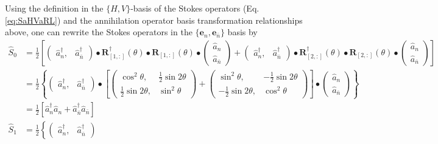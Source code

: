 \documentclass[preprint,aps,pra,onecolumn,superscriptaddress]{revtex4-1} %
\newcommand{\nn}{\nonumber}
\begin{document}
\begin{appendix}
Using the definition in the $ \{ H,V\} $-basis of the Stokes operators (Eq.\eqref{eq:SaHVaRL}) and the annihilation operator basis transformation relationships above, one can rewrite the Stokes operators in the $ \{\mathbf{e}_n, \mathbf{e}_{\bar{n}}\} $ basis by
\begin{subequations}\label{eq:Snnbar}
\begin{align}
\hat{S}_0 &= \frac{1}{2}\left[\left(\!\begin{array}{cc}\hat{a}_n^\dagger,& \hat{a}_{\bar{n}}^\dagger\end{array} \!\right)\bullet\mathbf{R}_{[1,:]}^\dagger(\theta)\bullet\mathbf{R}_{[1,:]}(\theta)\bullet
\left(\!\begin{array}{c}\hat{a}_n\\ \hat{a}_{\bar{n}}\end{array} \!\right)
+ \left(\!\begin{array}{cc}\hat{a}_n^\dagger,& \hat{a}_{\bar{n}}^\dagger\end{array} \!\right)\bullet\mathbf{R}^\dagger_{[2,:]}(\theta)\bullet\mathbf{R}_{[2,:]}(\theta)\bullet
\left(\!\begin{array}{c}\hat{a}_n\\ \hat{a}_{\bar{n}}\end{array} \!\right) \right]\nn\\
&= \frac{1}{2}\left\{\left(\!\begin{array}{cc}\hat{a}_n^\dagger,& \hat{a}_{\bar{n}}^\dagger\end{array} \!\right)\bullet
\left[\left(\!\begin{array}{cc}\cos^2\theta,& \frac{1}{2}\sin 2\theta \\ \frac{1}{2}\sin 2\theta, & \sin^2\theta\end{array} \!\right)
+ \left(\!\begin{array}{cc}\sin^2\theta,& -\frac{1}{2}\sin 2\theta \\ -\frac{1}{2}\sin 2\theta, & \cos^2\theta\end{array} \!\right)\right]\bullet
\left(\!\begin{array}{c}\hat{a}_n\\ \hat{a}_{\bar{n}}\end{array} \!\right)\right\}\nn\\
&=\frac{1}{2} \left[\hat{a}_n^\dagger\hat{a}_n+\hat{a}_{\bar{n}}^\dagger\hat{a}_{\bar{n}} \right]\\
\hat{S}_1 &= \frac{1}{2}\left\{\left(\!\begin{array}{cc}\hat{a}_n^\dagger,& \hat{a}_{\bar{n}}^\dagger\end{array} \!\right)

\end{align}
\end{subequations}
\end{appendix}
\end{document}
